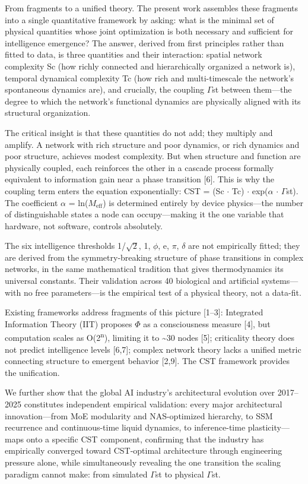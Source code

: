 \documentclass[a4paper,12pt]{article}
\begin{document}
From fragments to a unified theory. The present work assembles these fragments into a single quantitative framework by asking: what is the minimal set of physical quantities whose joint optimization is both necessary and sufficient for intelligence emergence? The answer, derived from first principles rather than fitted to data, is three quantities and their interaction: spatial network complexity Sc (how richly connected and hierarchically organized a network is), temporal dynamical complexity Tc (how rich and multi-timescale the network's spontaneous dynamics are), and crucially, the coupling $\Gamma$st between them---the degree to which the network's functional dynamics are physically aligned with its structural organization.


The critical insight is that these quantities do not add; they multiply and amplify. A network with rich structure and poor dynamics, or rich dynamics and poor structure, achieves modest complexity. But when structure and function are physically coupled, each reinforces the other in a cascade process formally equivalent to information gain near a phase transition [6]. This is why the coupling term enters the equation exponentially: CST = (Sc $\cdot$ Tc) $\cdot$ exp($\alpha$ $\cdot$ $\Gamma$st). The coefficient $\alpha$ = ln($M_{\text{eff}}$) is determined entirely by device physics---the number of distinguishable states a node can occupy---making it the one variable that hardware, not software, controls absolutely.


The six intelligence thresholds {1/$\sqrt{2}$, 1, $\phi$, e, $\pi$, $\delta$} are not empirically fitted; they are derived from the symmetry-breaking structure of phase transitions in complex networks, in the same mathematical tradition that gives thermodynamics its universal constants. Their validation across 40 biological and artificial systems---with no free parameters---is the empirical test of a physical theory, not a data-fit.


Existing frameworks address fragments of this picture [1--3]: Integrated Information Theory (IIT) proposes $\Phi$ as a consciousness measure [4], but computation scales as O(2\textsuperscript{n}), limiting it to \textasciitilde{}30 nodes [5]; criticality theory does not predict intelligence levels [6,7]; complex network theory lacks a unified metric connecting structure to emergent behavior [2,9]. The CST framework provides the unification.


We further show that the global AI industry's architectural evolution over 2017--2025 constitutes independent empirical validation: every major architectural innovation---from MoE modularity and NAS-optimized hierarchy, to SSM recurrence and continuous-time liquid dynamics, to inference-time plasticity---maps onto a specific CST component, confirming that the industry has empirically converged toward CST-optimal architecture through engineering pressure alone, while simultaneously revealing the one transition the scaling paradigm cannot make: from simulated $\Gamma$st to physical $\Gamma$st.
\end{document}
